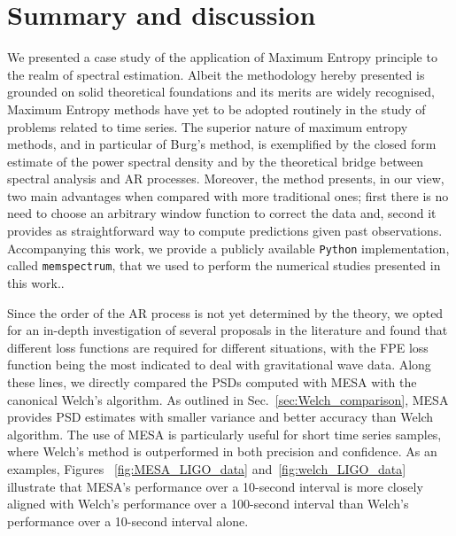 \documentclass[epj,nopacs]{svjour}
\begin{document}
\section{Summary and discussion} \label{sec:conclusion}

We presented a case study of the application of Maximum Entropy principle to the realm of spectral estimation. Albeit the methodology hereby presented is grounded on solid theoretical foundations and its merits are widely recognised, Maximum Entropy methods have yet to be adopted routinely in the study of problems related to time series. The superior nature of maximum entropy methods, and in particular of Burg's method, is exemplified by the closed form estimate of the power spectral density and by the theoretical bridge between spectral analysis and AR processes. Moreover, the method presents, in our view, two main advantages when compared with more traditional ones; first there is no need to choose an arbitrary window function to correct the data and, second it provides as straightforward way to compute predictions given past observations. Accompanying this work, we provide a publicly available \texttt{Python} implementation, called \texttt{memspectrum}, that we used to perform the numerical studies presented in this work.. 

Since the order of the AR process is not yet determined by the theory, we opted for an in-depth investigation of several proposals in the literature and found that different loss functions are required for different situations, with the FPE loss function being the most indicated to deal with gravitational wave data. Along these lines, we directly compared the PSDs computed with MESA with the canonical Welch's algorithm. As outlined in Sec.~\ref{sec:Welch_comparison}, MESA provides PSD estimates with smaller variance and better accuracy than Welch algorithm.
The use of MESA is particularly useful for short time series samples, where Welch's method is outperformed in both precision and confidence. As an examples, Figures ~\ref{fig:MESA_LIGO_data} and~\ref{fig:welch_LIGO_data} illustrate that MESA's performance over a 10-second interval is more closely aligned with Welch's performance over a 100-second interval than Welch's performance over a 10-second interval alone. 
\end{document}
